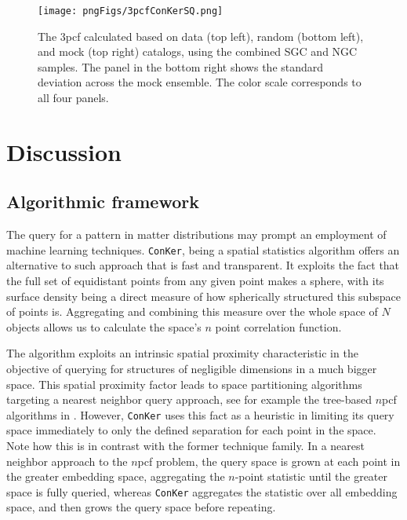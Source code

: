 \documentclass{aa}
\begin{document}
\begin{figure}
\texttt{[image: pngFigs/3pcfConKerSQ.png]}
\caption{The 3pcf calculated based on data (top left), random (bottom left), and mock (top right) catalogs, using the combined SGC and NGC samples. The panel in the bottom right shows the standard deviation across the mock ensemble. The color scale corresponds to all four panels.}
\label{fig:ConKer3ptSQ}
\end{figure}

\section{Discussion}

\subsection{Algorithmic framework}

The query for a pattern in matter distributions may prompt an employment of machine learning techniques.  {\tt ConKer}, being a spatial statistics algorithm  offers an alternative to such approach that is fast and transparent. It exploits the fact that the full set of equidistant points from any given point makes a sphere, with its surface density being a direct measure of how spherically structured this subspace of  points is. Aggregating and combining this measure over the whole space of $N$ objects allows us to calculate the space's $n$ point correlation function.

The algorithm exploits an intrinsic spatial proximity characteristic in the objective of querying for structures of negligible dimensions in a much bigger space. This spatial proximity factor leads to space partitioning algorithms targeting a nearest neighbor query approach, see for example the tree-based $n$pcf algorithms in \cite{MarchThesis}. However, {\tt ConKer} uses this fact as a heuristic in limiting its query space immediately to only the defined separation for each point in the space. Note how this is in contrast with the former technique family. In a nearest neighbor approach to the $n$pcf problem, the query space is grown at each point in the greater embedding space, aggregating the $n$-point statistic until the greater space is fully queried, whereas {\tt ConKer} aggregates the statistic over all embedding space, and then grows the query space before repeating.
\end{document}
